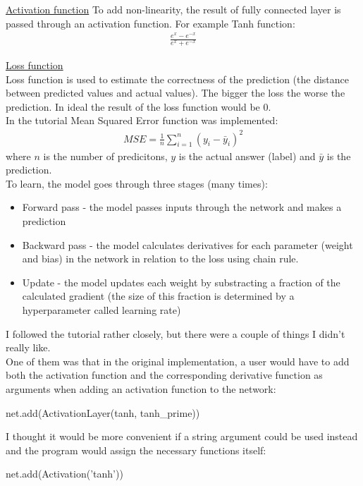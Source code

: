 \documentclass{article}
\begin{document}
\underline{Activation function}
To add non-linearity, the result of fully connected layer is passed through an activation function. For example Tanh function:
\begin{align*}
    \frac{e^{x} - e^{-x}}{e^{x} + e^{-x}}
\end{align*}

\underline{Loss function} \\
Loss function is used to estimate the correctness of the prediction (the distance between predicted values and actual values). 
The bigger the loss the worse the prediction. In ideal the result of the loss function would be 0. \\
In the tutorial Mean Squared Error function was implemented:
\begin{align*}
    MSE = \frac{1}{n} \sum_{i=1}^{n} (y_{i} - \bar{y}_{i}) ^{2}
\end{align*}
where $n$ is the number of predicitons, $y$ is the actual answer (label) and $\bar{y}$ is the prediction. \\

To learn, the model goes through three stages (many times):
\begin{itemize}
    \item Forward pass - the model passes inputs through the network and makes a prediction
    \item Backward pass - the model calculates derivatives for each parameter (weight and bias) in the network in relation to the loss using chain rule.
    \item Update - the model updates each weight by substracting a fraction of the calculated gradient (the size of this fraction is determined by a hyperparameter called learning rate)
\end{itemize}

I followed the tutorial rather closely, but there were a couple of things I didn't really like. \\

One of them was that in the original implementation, a user would have to add both the activation function and the 
corresponding derivative function as arguments when adding an activation function to the network:
\begin{python}
    net.add(ActivationLayer(tanh, tanh_prime))
\end{python}
I thought it would be more convenient if a string argument could be used instead and the program would assign 
the necessary functions itself:
\begin{python}
    net.add(Activation('tanh'))
\end{python}
\end{document}
